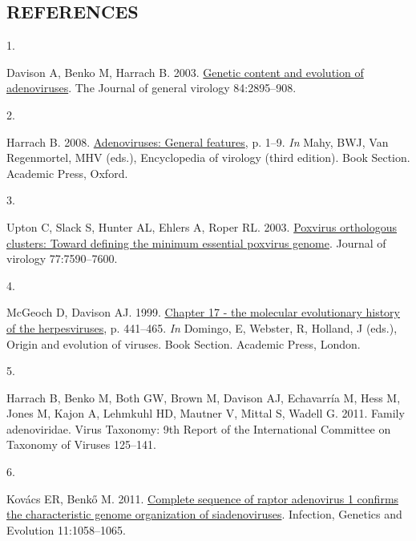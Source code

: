 \documentclass[
]{article}
\newlength{\cslhangindent}
\newlength{\csllabelwidth}
\newenvironment{CSLReferences}[2] %
 {\begin{list}{}{%
  \setlength{\itemindent}{0pt}
  \setlength{\leftmargin}{0pt}
  \setlength{\parsep}{0pt}
  \ifodd #1
   \setlength{\leftmargin}{\cslhangindent}
   \setlength{\itemindent}{-1\cslhangindent}
  \fi
  \setlength{\itemsep}{#2\baselineskip}}}
 {\end{list}}
\newcommand{\CSLLeftMargin}[1]{\parbox[t]{\csllabelwidth}{\strut#1\strut}}
\newcommand{\CSLRightInline}[1]{\parbox[t]{\linewidth - \csllabelwidth}{\strut#1\strut}}
\begin{document}
\subsection{REFERENCES}\label{references}

\setlength{\parindent}{-0.25in}
\setlength{\leftskip}{0.25in}

\noindent

\label{refs}
\begin{CSLReferences}{0}{1}
\CSLLeftMargin{1. }%
\CSLRightInline{Davison A, Benko M, Harrach B. 2003.
\href{https://doi.org/10.1099/vir.0.19497-0}{Genetic content and
evolution of adenoviruses}. The Journal of general virology
84:2895--908.}

\CSLLeftMargin{2. }%
\CSLRightInline{Harrach B. 2008.
\href{https://doi.org/10.1016/B978-012374410-4.00680-4}{Adenoviruses:
General features}, p. 1--9. \emph{In} Mahy, BWJ, Van Regenmortel, MHV
(eds.), Encyclopedia of virology (third edition). Book Section. Academic
Press, Oxford.}

\CSLLeftMargin{3. }%
\CSLRightInline{Upton C, Slack S, Hunter AL, Ehlers A, Roper RL. 2003.
\href{https://doi.org/10.1128/jvi.77.13.7590-7600.2003}{Poxvirus
orthologous clusters: Toward defining the minimum essential poxvirus
genome}. Journal of virology 77:7590--7600.}

\CSLLeftMargin{4. }%
\CSLRightInline{McGeoch D, Davison AJ. 1999.
\href{https://doi.org/10.1016/B978-012220360-2/50018-0}{Chapter 17 - the
molecular evolutionary history of the herpesviruses}, p. 441--465.
\emph{In} Domingo, E, Webster, R, Holland, J (eds.), Origin and
evolution of viruses. Book Section. Academic Press, London.}

\CSLLeftMargin{5. }%
\CSLRightInline{Harrach B, Benko M, Both GW, Brown M, Davison AJ,
Echavarría M, Hess M, Jones M, Kajon A, Lehmkuhl HD, Mautner V, Mittal
S, Wadell G. 2011. Family adenoviridae. Virus Taxonomy: 9th Report of
the International Committee on Taxonomy of Viruses 125--141.}

\CSLLeftMargin{6. }%
\CSLRightInline{Kovács ER, Benkő M. 2011.
\href{https://doi.org/10.1016/j.meegid.2011.03.021}{Complete sequence of
raptor adenovirus 1 confirms the characteristic genome organization of
siadenoviruses}. Infection, Genetics and Evolution 11:1058--1065.}


\end{CSLReferences}
\end{document}
